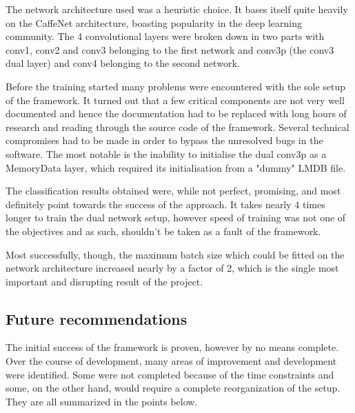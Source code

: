 \documentclass[a4paper, 12pt]{article}
\numberwithin{equation}{section}
\begin{document}
	The network architecture used was a heuristic choice. It bases itself quite heavily on the CaffeNet architecture, boasting popularity in the deep learning community. The 4 convolutional layers were broken down in two parts with conv1, conv2 and conv3 belonging to the first network and conv3p (the conv3 dual layer) and conv4 belonging to the second network.

	Before the training started many problems were encountered with the sole setup of the framework. It turned out that a few critical components are not very well documented and hence the documentation had to be replaced with long hours of research and reading through the source code of the framework. Several technical compromises had to be made in order to bypass the unresolved bugs in the software. The most notable is the inability to initialise the dual conv3p as a MemoryData layer, which required its initialisation from a "dummy" LMDB file.

	The classification results obtained were, while not perfect, promising, and most definitely point towards the success of the approach. It takes nearly 4 times longer to train the dual network setup, however speed of training was not one of the objectives and as such, shouldn't be taken as a fault of the framework.

	Most successfully, though, the maximum batch size which could be fitted on the network architecture increased nearly by a factor of 2, which is the single most important and disrupting result of the project.

	\subsection{Future recommendations}
	
	The initial success of the framework is proven, however by no means complete. Over the course of development, many areas of improvement and development were identified. Some were not completed because of the time constraints and some, on the other hand, would require a complete reorganization of the setup. They are all summarized in the points below.
\end{document}
